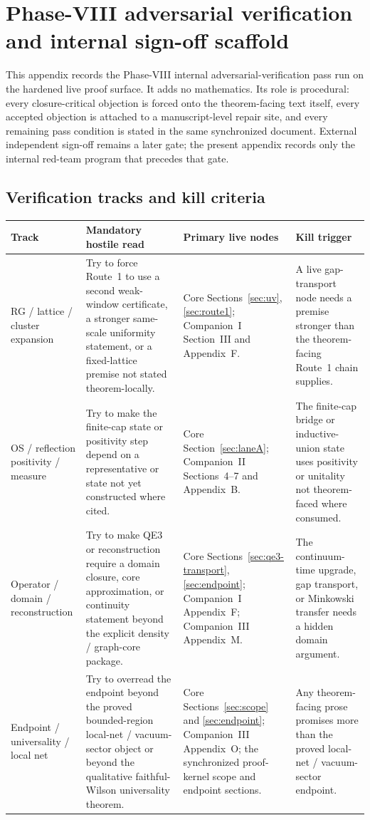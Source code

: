 \section{Phase-VIII adversarial verification and internal sign-off scaffold}\label{app:phase8-verification}

This appendix records the Phase-VIII internal adversarial-verification pass run on the hardened live proof surface. It adds no mathematics. Its role is procedural: every closure-critical objection is forced onto the theorem-facing text itself, every accepted objection is attached to a manuscript-level repair site, and every remaining pass condition is stated in the same synchronized document. External independent sign-off remains a later gate; the present appendix records only the internal red-team program that precedes that gate.

\subsection*{Verification tracks and kill criteria}
\begingroup
\footnotesize
\setlength{\tabcolsep}{4pt}
\renewcommand{\arraystretch}{1.08}
\noindent\begin{tabular}{@{}p{}p{}p{}p{}@{}}
\toprule
\textbf{Track} & \textbf{Mandatory hostile read} & \textbf{Primary live nodes} & \textbf{Kill trigger}\\
\midrule
RG / lattice / cluster expansion & Try to force Route~1 to use a second weak-window certificate, a stronger same-scale uniformity statement, or a fixed-lattice premise not stated theorem-locally. & Core Sections~\ref{sec:uv}, \ref{sec:route1}; Companion~I Section~III and Appendix~F. & A live gap-transport node needs a premise stronger than the theorem-facing Route~1 chain supplies.\\[0.35em]
OS / reflection positivity / measure & Try to make the finite-cap state or positivity step depend on a representative or state not yet constructed where cited. & Core Section~\ref{sec:laneA}; Companion~II Sections~4--7 and Appendix~B. & The finite-cap bridge or inductive-union state uses positivity or unitality not theorem-faced where consumed.\\[0.35em]
Operator / domain / reconstruction & Try to make QE3 or reconstruction require a domain closure, core approximation, or continuity statement beyond the explicit density / graph-core package. & Core Sections~\ref{sec:qe3-transport}, \ref{sec:endpoint}; Companion~I Appendix~F; Companion~III Appendix~M. & The continuum-time upgrade, gap transport, or Minkowski transfer needs a hidden domain argument.\\[0.35em]
Endpoint / universality / local net & Try to overread the endpoint beyond the proved bounded-region local-net / vacuum-sector object or beyond the qualitative faithful-Wilson universality theorem. & Core Sections~\ref{sec:scope} and \ref{sec:endpoint}; Companion~III Appendix~O; the synchronized proof-kernel scope and endpoint sections. & Any theorem-facing prose promises more than the proved local-net / vacuum-sector endpoint.\\
\bottomrule
\end{tabular}
\endgroup

